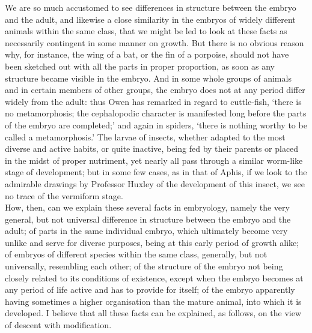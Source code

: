 \indent We are so much accustomed to see differences in structure between the embryo and the adult, and likewise a close similarity in the embryos of widely different animals within the same class, that we might be led to look at these facts as necessarily contingent in some manner on growth. But there is no obvious reason why, for instance, the wing of a bat, or the fin of a porpoise, should not have been sketched out with all the parts in proper proportion, as soon as any structure became visible in the embryo. And in some whole groups of animals and in certain members of other groups, the embryo does not at any period differ widely from the adult: thus Owen has remarked in regard to cuttle-fish, `there is no metamorphosis; the cephalopodic character is manifested long before the parts of the embryo are completed;' and again in spiders, `there is nothing worthy to be called a metamorphosis.' The larvae of insects, whether adapted to the most diverse and active habits, or quite inactive, being fed by their parents or placed in the midst of proper nutriment, yet nearly all pass through a similar worm-like stage of development; but in some few cases, as in that of Aphis, if we look to the admirable drawings by Professor Huxley of the development of this insect, we see no trace of the vermiform stage.~\\
\indent How, then, can we explain these several facts in embryology, namely the very general, but not universal difference in structure between the embryo and the adult; of parts in the same individual embryo, which ultimately become very unlike and serve for diverse purposes, being at this early period of growth alike; of embryos of different species within the same class, generally, but not universally, resembling each other; of the structure of the embryo not being closely related to its conditions of existence, except when the embryo becomes at any period of life active and has to provide for itself; of the embryo apparently having sometimes a higher organisation than the mature animal, into which it is developed. I believe that all these facts can be explained, as follows, on the view of descent with modification.~\\
